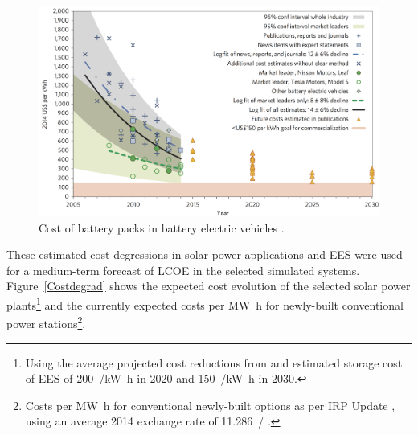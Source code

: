 \begin{figure}[htbp]  
\centering
\includegraphics[width=1\linewidth]{FIG/CostofLi-ion}
\caption[Cost of battery packs in battery electric vehicles.]{Cost of battery packs in battery electric vehicles \cite{Nykvist2015}.}\label{CostofLi-ion}
\end{figure}

These estimated cost degressions in solar power applications and EES were used for a medium-term forecast of LCOE in the selected simulated systems. Figure~\ref{Costdegrad} shows the expected cost evolution of the selected solar power plants\footnote{Using the average projected cost reductions from \cite{IEA2014c} and estimated storage cost of EES of \SI{200}{\usd/\kilo\watt\hour} in 2020 and \SI{150}{\usd/\kilo\watt\hour} in 2030.} and the currently expected costs per \si{\mega\watt\hour} for newly-built conventional power stations\footnote{Costs per \si{\mega\watt\hour} for conventional newly-built options as per IRP Update \cite{CSIR2015a}, using an average 2014 exchange rate of \SI{11.286}{\usd/\zar} \cite{IRS2015}.}.

